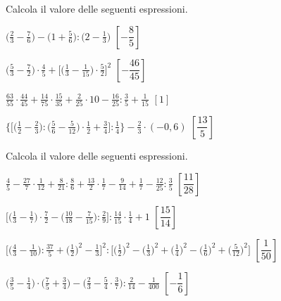 \begin{esercizio}[\Ast]
\label{ese:3.145}
 Calcola il valore delle seguenti espressioni.
\begin{enumeratea}
\spazielenx
\item \(\displaystyle{\bigg(\frac{2}{3}-\frac{7}{6}\bigg)-\bigg(1+
\frac{5}{6}\bigg):\bigg(2-\frac{1}{3}\bigg)}\)
  \hfill \(\left[-\dfrac{8}{5} \right]\)
\item \(\displaystyle{\bigg(\frac{5}{3}-\frac{7}{2}\bigg)\cdot\frac{4}{5}+
\bigg[\bigg(\frac{1}{3}-\frac{1}{15}\bigg)%
\cdot\frac{5}{2}\bigg]^{2}}\)
  \hfill \(\left[-\dfrac{46}{45} \right]\)
\item \(\displaystyle{\frac{63}{55}\cdot\frac{44}{45}+\frac{14}{75}\cdot
\frac{15}{35}+\frac{2}{25}\cdot%
10-\frac{16}{25}:\frac{3}{5}+\frac{1}{15}}\)
  \hfill \(\left[1 \right]\)
\item \(\displaystyle{\bigg\{\bigg[\bigg(\frac{1}{2}-\frac{2}{3}\bigg):
\bigg(\frac{5}{6}-\frac{5}{12}\bigg)\cdot%
\frac{1}{2}+\frac{3}{4}\bigg]:\frac{1}{4}\bigg\}-\frac{2}{3}\cdot(-0,6)}\)
  \hfill \(\left[\dfrac{13}{5} \right]\)
\end{enumeratea}
\end{esercizio}

\begin{esercizio}[\Ast]
\label{ese:3.146}
Calcola il valore delle seguenti espressioni.
\begin{enumeratea}
\spazielenx
\item \(\displaystyle{\frac{4}{5}-\frac{27}{7}\cdot{\frac{1}{12}}+
\frac{8}{21}:\frac{8}{6}+\frac{13}{2}\cdot
\frac{1}{7}-\frac{9}{14}+\frac{1}{7}-\frac{12}{25}:\frac{3}{5}}\)
  \hfill \(\left[\dfrac{11}{28} \right]\)
\item \(\displaystyle{\bigg[\bigg(\frac{1}{3}-\frac{1}{7}\bigg)\cdot
{\frac{7}{2}}-\bigg(\frac{10}{18}-\frac{7}{15}\bigg):\frac{2}{9}\bigg]:
\frac{14}{15}\cdot{\frac{1}{4}}+1}\)
  \hfill \(\left[\dfrac{15}{14} \right]\)
\item \(\displaystyle{\bigg[\bigg(\frac{4}{3}-\frac{1}{10}\bigg):
\frac{37}{5}+\bigg(\frac{1}{2}\bigg)^{2}-\frac{1}{3}%
\bigg]^{2}:\bigg[\bigg(\frac{1}{2}\bigg)^{2}-\bigg(\frac{1}{3}\bigg)^{2}+
\bigg(\frac{1}{4}\bigg)^{2}-%
\bigg(\frac{1}{6}\bigg)^{2}+\bigg(\frac{5}{12}\bigg)^{2}\bigg]}\)
  \hfill \(\left[\dfrac{1}{50} \right]\)
\item \(\displaystyle{\bigg(\frac{3}{5}-\frac{1}{4}\bigg)\cdot
\bigg(\frac{7}{5}+\frac{3}{4}\bigg)-\bigg(\frac{2}{3}-%
\frac{5}{4}\cdot\frac{3}{7}\bigg):\frac{2}{14}-\frac{1}{400}}\)
  \hfill \(\left[-\dfrac{1}{6} \right]\)
\end{enumeratea}
\end{esercizio}

